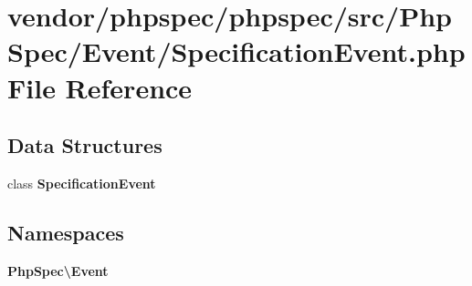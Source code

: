 \section{vendor/phpspec/phpspec/src/\+Php\+Spec/\+Event/\+Specification\+Event.php File Reference}
\label{_specification_event_8php}
\subsection*{Data Structures}
\begin{DoxyCompactItemize}
\item 
class {\bf Specification\+Event}
\end{DoxyCompactItemize}
\subsection*{Namespaces}
\begin{DoxyCompactItemize}
\item 
 {\bf Php\+Spec\textbackslash{}\+Event}
\end{DoxyCompactItemize}
